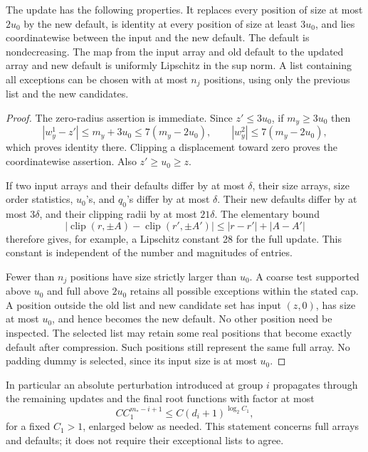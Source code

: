 \begin{lemma}
\label{lem:buf-update}
The update has the following properties.
It replaces every position of size at most $2u_0$ by the new default, is
identity at every position of size at least $3u_0$, and lies coordinatewise
between the input and the new default.  The default is nondecreasing.
The map from the input array and old default to the updated array and new
default is uniformly Lipschitz in the sup norm.  A list containing all
exceptions can be chosen with at most $n_j$ positions, using only the
previous list and the new candidates.
\end{lemma}
\begin{proof}
The zero-radius assertion is immediate.  Since $z'\leq3u_0$, if $m_y\geq3u_0$
then
\[
 |w_y^1-z'|\leq m_y+3u_0\leq7(m_y-2u_0),
 \qquad |w_y^2|\leq7(m_y-2u_0),
\]
which proves identity there.  Clipping a displacement toward zero proves
the coordinatewise assertion.  Also $z'\geq u_0\geq z$.

If two input arrays and their defaults differ by at most $\delta$, their
size arrays, size order statistics, $u_0$'s, and $q_0$'s differ by at most $\delta$.
Their new defaults differ by at most $3\delta$, and their clipping radii
by at most $21\delta$.  The elementary bound
\[
 |\operatorname{clip}(r,\pm A)-\operatorname{clip}(r',\pm A')|
       \leq |r-r'|+|A-A'|
\]
therefore gives, for example, a Lipschitz constant 28 for the full update.
This constant is independent of the number and magnitudes of entries.

Fewer than $n_j$ positions have size strictly larger than $u_0$.
A coarse test supported above $u_0$ and full above $2u_0$ retains all
possible exceptions within the stated cap.  A position outside the old
list and new candidate set has input $(z,0)$, has size at most $u_0$,
and hence becomes the new default.  No other position need be inspected.
The selected list may retain some real positions that become exactly
default after compression.  Such positions still represent the same
full array.  No padding dummy is selected, since its input size is at
most $u_0$.
\end{proof}

In particular an absolute perturbation introduced at group $i$ propagates
through the remaining updates and the final root functions with factor
at most
\begin{equation}
 C C_1^{m_*-i+1}
       \leq C(d_i+1)^{\log_2 C_1},
 \label{eq:buf-propagation}
\end{equation}
for a fixed $C_1>1$, enlarged below as needed.  This statement concerns
full arrays and defaults; it does not require their exceptional lists to
agree.

